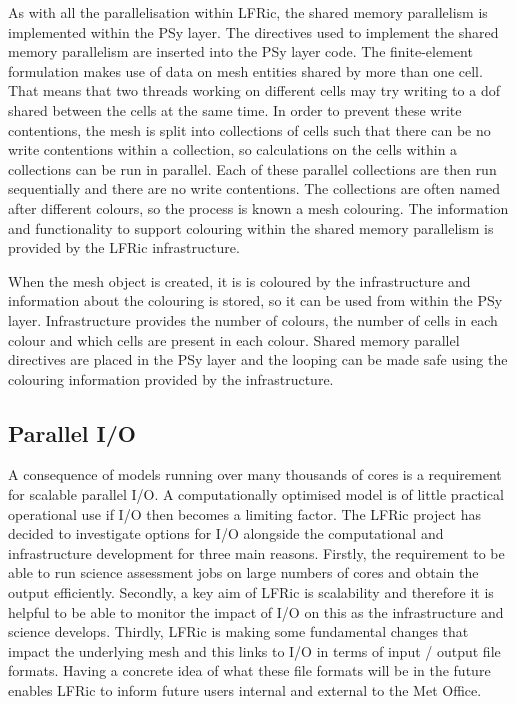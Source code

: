 \documentclass[review,times]{elsarticle}
\begin{document}
As with all the parallelisation within LFRic, the shared memory
parallelism is implemented within the PSy layer. The directives used to
implement the shared memory parallelism are inserted into the PSy layer
code. The finite-element formulation makes use of data on mesh entities
shared by more than one cell. That means that two threads working on
different cells may try writing to a dof shared between the cells at the
same time. In order to prevent these write contentions, the mesh is
split into collections of cells such that there can be no write
contentions within a collection, so calculations on the cells within a
collections can be run in parallel. Each of these parallel collections
are then run sequentially and there are no write contentions. The
collections are often named after different colours, so the process is
known a mesh colouring. The information and functionality to support
colouring within the shared memory parallelism is provided by the LFRic
infrastructure.

When the mesh object is created, it is is coloured by the infrastructure
and information about the colouring is stored, so it can be used from
within the PSy layer. Infrastructure provides the number of colours,
the number of cells in each colour and which cells are present in each
colour. Shared memory parallel directives are placed in the PSy layer
and the looping can be made safe using the colouring information
provided by the infrastructure. 

\subsection{\label{sec:io}Parallel I/O}

A consequence of models running over many thousands of cores is a requirement
for scalable parallel I/O. A computationally optimised model is of little practical
operational use if I/O then becomes a limiting factor. The LFRic project has
decided to investigate options for I/O alongside the computational
and infrastructure development for three main reasons. Firstly, the requirement
to be able to run science assessment jobs on large numbers of cores and obtain the
output efficiently. Secondly, a key aim of LFRic is scalability and therefore it is
helpful to be able to monitor the impact of I/O on this as the infrastructure and
science develops. Thirdly, LFRic is making some fundamental changes that impact the
underlying mesh and this links to I/O in terms of input / output file formats. Having
a concrete idea of what these file formats will be in the future enables LFRic to
inform future users internal and external to the Met Office.
\end{document}
